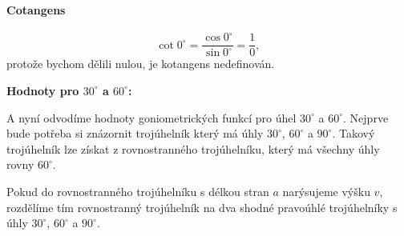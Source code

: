 \documentclass[12pt,a4paper]{article}
\begin{document}
\paragraph{Cotangens}
\[
\cot 0^\circ
= \frac{\cos 0^\circ}{\sin 0^\circ}
= \frac{1}{0},
\]
protože bychom dělili nulou, je kotangens nedefinován.



\bigskip
\textbf{Hodnoty pro $30^\circ$ a $60^\circ$:}

A nyní odvodíme hodnoty goniometrických funkcí pro úhel $30^\circ$ a $60^\circ$.
Nejprve bude potřeba si znázornit trojúhelník který má úhly $30^\circ$, $60^\circ$ a $90^\circ$.
Takový trojúhelník lze získat z rovnostranného trojúhelníku, který má všechny úhly rovny $60^\circ$.

Pokud do rovnostranného trojúhelníku s délkou stran $a$ narýsujeme výšku $v$, rozdělíme tím rovnostranný trojúhelník 
na dva shodné pravoúhlé trojúhelníky s úhly $30^\circ$, $60^\circ$ a $90^\circ$. 
\end{document}

